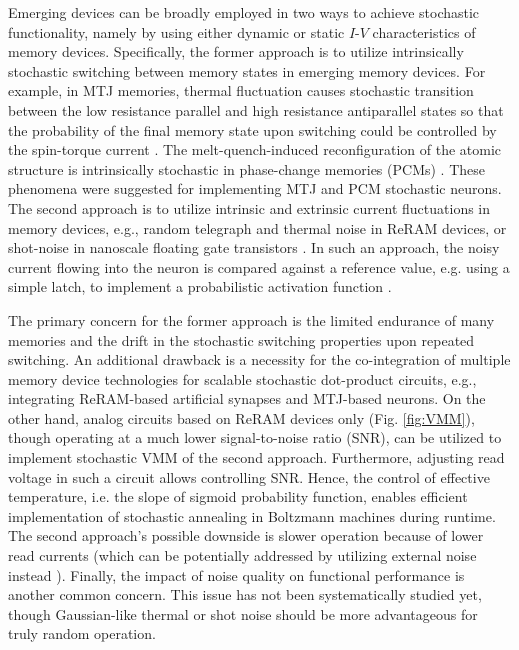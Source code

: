 Emerging devices can be broadly employed in two ways to achieve stochastic functionality, namely by using either dynamic or static $I$-$V$ characteristics of memory devices. Specifically, the former approach is to utilize intrinsically stochastic switching between memory states in emerging memory devices. For example, in MTJ memories, thermal fluctuation causes stochastic transition between the low resistance parallel and high resistance antiparallel states so that the probability of the final memory state upon switching could be controlled by the spin-torque current \cite{Grollier2020}. The melt-quench-induced reconfiguration of the atomic structure is intrinsically stochastic in phase-change memories (PCMs) \cite{Tuma2016}. These phenomena were suggested for implementing MTJ \cite{Ostwal2018} and PCM \cite{Tuma2016} stochastic neurons. The second approach is to utilize intrinsic and extrinsic current fluctuations in memory devices, e.g., random telegraph \cite{Cai2020NatElec} and thermal noise \cite{Mahmoodi2019IEDM} in ReRAM devices, or shot-noise in nanoscale floating gate transistors \cite{Mahmoodi2019IEDM, Mahmoodi2019NatComm}. In such an approach, the noisy current flowing into the neuron is compared against a reference value, e.g. using a simple latch, to implement a probabilistic activation function \cite{Mahmoodi2019NatComm}. 

The primary concern for the former approach is the limited endurance of many memories and the drift in the stochastic switching properties upon repeated switching. An additional drawback is a necessity for the co-integration of multiple memory device technologies for scalable stochastic dot-product circuits, e.g., integrating ReRAM-based artificial synapses and MTJ-based neurons. On the other hand, analog circuits based on ReRAM devices only (Fig. \ref{fig:VMM}), though operating at a much lower signal-to-noise ratio (SNR), can be utilized to implement stochastic VMM of the second approach. Furthermore, adjusting read voltage in such a circuit allows controlling SNR. Hence, the control of effective temperature, i.e. the slope of sigmoid probability function, enables efficient implementation of stochastic annealing in Boltzmann machines during runtime. The second approach's possible downside is slower operation because of lower read currents (which can be potentially addressed by utilizing external noise instead \cite{Mahmoodi2019NatComm}). Finally, the impact of noise quality on functional performance is another common concern. This issue has not been systematically studied yet, though Gaussian-like thermal or shot noise should be more advantageous for truly random operation.



